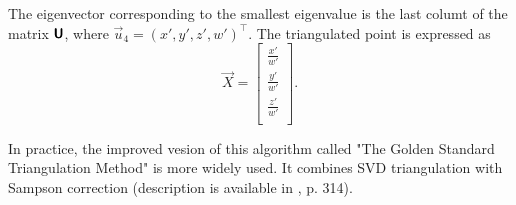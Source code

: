 The eigenvector corresponding to the smallest eigenvalue is the last columt of the matrix $\pmb{\mathsf{U}}$, where $\vec{u}_4 = (x', y', z', w')^\top$.
The triangulated point is expressed as
\begin{equation}
    \vec{X} = \begin{bmatrix}
        \frac{x'}{w'} \\
        \frac{y'}{w'} \\
        \frac{z'}{w'} \\
    \end{bmatrix}.
\end{equation}

In practice, the improved vesion of this algorithm called "The Golden Standard Triangulation Method" is more widely used.
It combines SVD triangulation with Sampson correction (description is available in \cite{hartley_zisserman_2004}, p. 314). 
